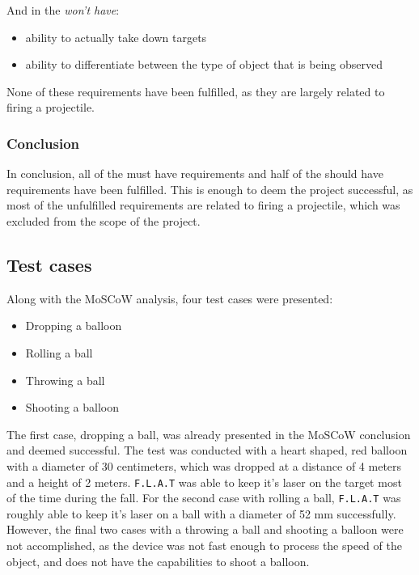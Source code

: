 And in the \textit{won't have}:
\begin{itemize}
	\item ability to actually take down targets
	\item ability to differentiate between the type of object that is being observed
\end{itemize}

None of these requirements have been fulfilled, as they are largely related to firing a projectile.

\subsubsection{Conclusion}
In conclusion, all of the must have requirements and half of the should have requirements have been fulfilled.
This is enough to deem the project successful, as most of the unfulfilled requirements are related to firing a projectile, which was excluded from the scope of the project. 

\subsection{Test cases}
Along with the MoSCoW analysis, four test cases were presented: 
\begin{itemize}
    \item Dropping a balloon
    \item Rolling a ball
    \item Throwing a ball
    \item Shooting a balloon
\end{itemize}

The first case, dropping a ball, was already presented in the MoSCoW conclusion and deemed successful.
The test was conducted with a heart shaped, red balloon with a diameter of 30 centimeters, which was dropped at a distance of 4 meters and a height of 2 meters. 
\texttt{F.L.A.T} was able to keep it's laser on the target most of the time during the fall. 
For the second case with rolling a ball, \texttt{F.L.A.T} was roughly able to keep it's laser on a ball with a diameter of 52 mm successfully. 
However, the final two cases with a throwing a ball and shooting a balloon were not accomplished, as the device was not fast enough to process the speed of the object, and does not have the capabilities to shoot a balloon.

